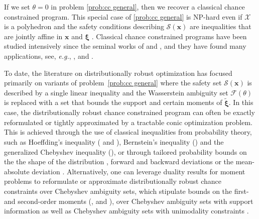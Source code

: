 \documentclass[nonblindrev]{informs2017}
\newcommand{\1}[1]{\mathds{1}{\left(#1\right)}}
\begin{document}
If we set $\theta = 0$ in problem \eqref{prob:cc general}, then we recover a classical chance constrained program. This special case of \eqref{prob:cc general} is NP-hard even if $\mathcal{X}$ is a polyhedron and the safety conditions describing $\mathcal{S}(\bm{x})$ are inequalities that are jointly affine in $\bm{x}$ and $\bm{\xi}$ \citep[Theorem~1]{luedtke2010}. Classical chance constrained programs have been studied intensively since the seminal works of \cite{charnes1958cost} and \cite{charnes1959chance}, and they have found many applications, see, \emph{e.g.}, \cite{shapiro2009lectures}, \cite{birge2011introduction} and \cite{prekopa2013stochastic}.

To date, the literature on distributionally robust optimization has focused primarily on variants of problem~\eqref{prob:cc general} where the safety set $\mathcal{S}(\bm{x})$ is described by a single linear inequality and the Wasserstein ambiguity set $\mathcal{F}(\theta)$ is replaced with a set that bounds the support and certain moments of $\tilde{\bm{\xi}}$. In this case, the distributionally robust chance constrained program can often be exactly reformulated or tightly approximated by a tractable conic optimization problem. This is achieved through the use of classical inequalities from probability theory, such as Hoeffding's inequality (\citealt{Ben-tal_Nemirovski_2000} and \citealt{Bertsimas_Sim_2004}), Bernstein's inequality (\citealt{Nemirovski_Shapiro_2006}) and the generalized Chebyshev inequality (\citealt{xu2012optimization}), or through tailored probability bounds on the the shape of the distribution \citep{calafiore2006distributionally}, forward and backward deviations \citep{Chen_Sim_Sun_2007} or the mean-absolute deviation \citep{Postek_2018}. Alternatively, one can leverage duality results for moment problems to reformulate or approximate distributionally robust chance constraints over Chebyshev ambiguity sets, which stipulate bounds on the first- and second-order moments (\citealt{ElGhaoui_Oks_Oustry_2003}, \citealt{calafiore2006distributionally} and \citealt{Popescu_2007}), over Chebyshev ambiguity sets with support information \citep{cheng2014distributionally} as well as Chebyshev ambiguity sets with unimodality constraints \citep{li2016ambiguous}.
\end{document}
